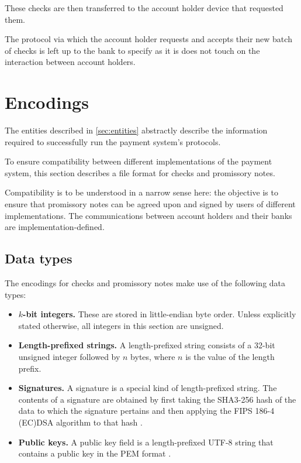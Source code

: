 \documentclass[12pt,a4paper]{article}
\begin{document}
\begin{multicols}{2}
	These checks are then transferred to the account holder device that requested them.

	The protocol via which the account holder requests and accepts their new batch of checks is left up to the bank to specify as it is does not touch on the interaction between account holders.
	
	\section{Encodings}
	
	The entities described in \autoref{sec:entities} abstractly describe the information required to successfully run the payment system's protocols.
	
	To ensure compatibility between different implementations of the payment system, this section describes a file format for checks and promissory notes.
	
	Compatibility is to be understood in a narrow sense here: the objective is to ensure that promissory notes can be agreed upon and signed by users of different implementations. The communications between account holders and their banks are implementation-defined.
	
	\subsection{Data types}
	\label{sec:data-types}
	
	The encodings for checks and promissory notes make use of the following data types:
	
	\begin{itemize}
		\item \textbf{$k$-bit integers.} These are stored in little-endian byte order. Unless explicitly stated otherwise, all integers in this section are unsigned.
		
		\item \textbf{Length-prefixed strings.} A length-prefixed string consists of a 32-bit unsigned integer followed by $n$ bytes, where $n$ is the value of the length prefix.
		
		\item \textbf{Signatures.} A signature is a special kind of length-prefixed string. The contents of a signature are obtained by first taking the SHA3-256 hash of the data to which the signature pertains and then applying the FIPS 186-4 (EC)DSA algorithm to that hash \cite{fips-202-sha3, fips-186-4-dss}.
		
		\item \textbf{Public keys.} A public key field is a length-prefixed UTF-8 string that contains a public key in the PEM format \cite{rfc-pem}.


\end{itemize}
\end{multicols}
\end{document}
